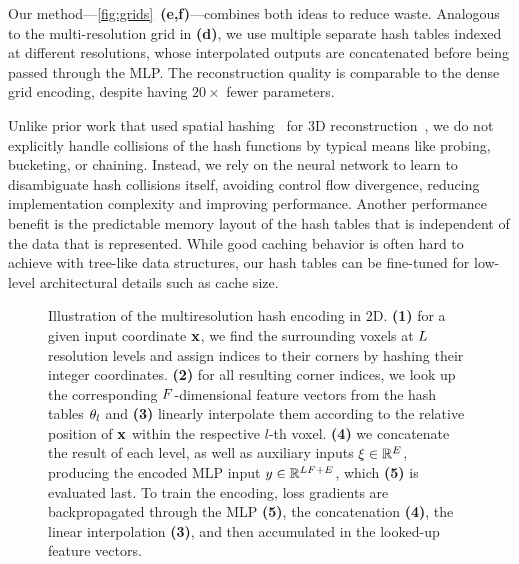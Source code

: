 \documentclass[acmtog,authorversion]{acmart}
\begin{document}
Our method---\autoref{fig:grids}~\textbf{(e,f)}---combines both ideas to reduce waste.
Analogous to the multi-resolution grid in \textbf{(d)}, we use multiple separate hash tables indexed at different resolutions, whose interpolated outputs are concatenated before being passed through the MLP.\@
The reconstruction quality is comparable to the dense grid encoding, despite having ${20\times}$ fewer parameters.

Unlike prior work that used spatial hashing~\citep{SpatialHash:03} for 3D reconstruction~\citep{niessner2013reconstruction}, we do not explicitly handle collisions of the hash functions by typical means like probing, bucketing, or chaining.
Instead, we rely on the neural network to learn to disambiguate hash collisions itself, avoiding control flow divergence, reducing implementation complexity and improving performance.
Another performance benefit is the predictable memory layout of the hash tables that is independent of the data that is represented. While good caching behavior is often hard to achieve with tree-like data structures, our hash tables can be fine-tuned for low-level architectural details such as cache size.

\begin{figure}
  \centering
  \small\sffamily
  \vspace{1mm}
  
  \vspace{5mm}
  \caption{\label{fig:encoding}%
    Illustration of the multiresolution hash encoding in $2$D.
    \textbf{(1)} for a given input coordinate $\mathbf{x}$, we find the surrounding voxels at $L$ resolution levels and assign indices to their corners by hashing their integer coordinates.
    \textbf{(2)} for all resulting corner indices, we look up the corresponding $F$-dimensional feature vectors from the hash tables $\theta_l$ and \textbf{(3)} linearly interpolate them according to the relative position of $\mathbf{x}$ within the respective $l$-th voxel.
    \textbf{(4)} we concatenate the result of each level, as well as auxiliary inputs ${\mathbf{\xi} \in \mathbb{R}^E}$, producing the encoded MLP input ${y \in \mathbb{R}^{LF + E}}$, which \textbf{(5)} is evaluated last.
    To train the encoding, loss gradients are backpropagated through the MLP \textbf{(5)}, the concatenation \textbf{(4)}, the linear interpolation \textbf{(3)}, and then accumulated in the looked-up feature vectors.
  }\vspace{-2mm}
\end{figure}
\end{document}
